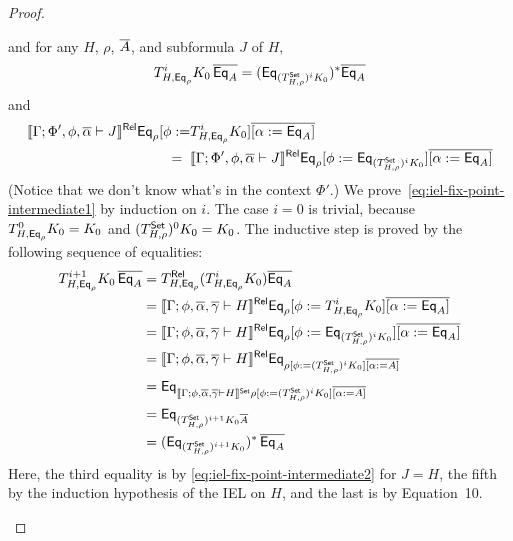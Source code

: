 \documentclass[acmsmall,review,anonymous]{acmart}
\theoremstyle{definition}
\begin{document}
\begin{proof}
\begin{itemize}
and for any $H$, $\rho$, $\overline{A}$, and subformula $J$ of $H$,
\begin{equation}\label{eq:iel-fix-point-intermediate1}
T^i_{H, \mathsf{Eq}_{\rho}} K_0\, \overline{\mathsf{Eq}_A} = (\mathsf{Eq}_{(T^{\mathsf{Set}}_{H, \rho})^i K_0})^*
\overline{\mathsf{Eq}_A}
\end{equation}
and 
\begin{equation}\label{eq:iel-fix-point-intermediate2}
\begin{split}
  \llbracket{\Gamma; \Phi', \phi, \overline{\alpha} \vdash J}\rrbracket^{\mathsf{Rel}}
\mathsf{Eq}_{\rho} [\phi := 
 & T^i_{H,\mathsf{Eq}_{\rho}} K_0] \overline{[\alpha :=
    \mathsf{Eq}_A]} \\
=\;\; & \llbracket{\Gamma; \Phi', \phi, \overline{\alpha} \vdash J}\rrbracket^{\mathsf{Rel}} \mathsf{Eq}_{\rho} [\phi
  := \mathsf{Eq}_{(T^{\mathsf{Set}}_{H,\rho})^i K_0}] \overline{[\alpha :=
    \mathsf{Eq}_A]}
\end{split}
\end{equation}
(Notice that we don't know what's in the context $\Phi'$.)  We
prove~\eqref{eq:iel-fix-point-intermediate1} by induction on $i$.  The
case $i=0$ is trivial, because $T^0_{H,\mathsf{Eq}_{\rho}} K_0 = K_0$ and
$(T^{\mathsf{Set}}_{H,\rho})^0 K_0 = K_0$. The inductive step
is proved by the following sequence of equalities:
\[
\begin{split}
T^{i+1}_{H,\mathsf{Eq}_{\rho}} K_0\, \overline{\mathsf{Eq}_A}
&= T^{\mathsf{Rel}}_{H,\mathsf{Eq}_{\rho}} (T^i_{H,\mathsf{Eq}_{\rho}} K_0)
\overline{\mathsf{Eq}_A} \\ 
&= \llbracket{\Gamma; \phi, \overline{\alpha}, \overline{\gamma} \vdash H}\rrbracket^{\mathsf{Rel}} \mathsf{Eq}_{\rho} [\phi
  := T^i_{H, \mathsf{Eq}_{\rho}} K_0] \overline{[\alpha :=
    \mathsf{Eq}_A]} \\ 
&= \llbracket{\Gamma; \phi, \overline{\alpha}, \overline{\gamma} \vdash H}\rrbracket^{\mathsf{Rel}} \mathsf{Eq}_{\rho} [\phi
  := \mathsf{Eq}_{(T^{\mathsf{Set}}_{H,\rho})^i K_0}] \overline{[\alpha :=
    \mathsf{Eq}_A]} \\ 
&= \llbracket{\Gamma; \phi, \overline{\alpha}, \overline{\gamma} \vdash H}\rrbracket^{\mathsf{Rel}} \mathsf{Eq}_{\rho [\phi
    := (T^{\mathsf{Set}}_{H,\rho})^i K_0] \overline{[\alpha :=
      A]}} \\ 
&= \mathsf{Eq}_{\llbracket{\Gamma; \phi, \overline{\alpha}, \overline{\gamma} \vdash H}\rrbracket^{\mathsf{Set}} \rho [\phi
    := (T^{\mathsf{Set}}_{H,\rho})^i K_0] \overline{[\alpha :=
      A]}} \\ 
&= \mathsf{Eq}_{(T^{\mathsf{Set}}_{H,\rho})^{i+1} K_0 \overline{A}} \\ 
&= (\mathsf{Eq}_{(T^{\mathsf{Set}}_{H,\rho})^{i+1} K_0})^*\, \overline{\mathsf{Eq}_A} 
\end{split}
\]
Here, the third equality is by \eqref{eq:iel-fix-point-intermediate2}
for $J = H$, the fifth by the induction hypothesis of the IEL on $H$,
and the last is by Equation~10.

\end{itemize}
\end{proof}
\end{document}
